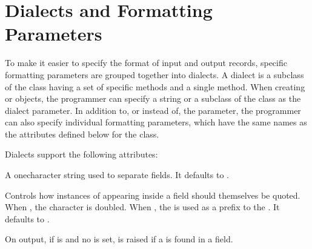\documentclass[letterpaper,10pt,english]{sphinxmanual}
\begin{document}
\section{Dialects and Formatting Parameters}
\label{\detokenize{csv:dialects-and-formatting-parameters}}\label{\detokenize{csv:csv-fmt-params}}
To make it easier to specify the format of input and output records, specific
formatting parameters are grouped together into dialects.  A dialect is a
subclass of the {\hyperref[\detokenize{csv:csv.Dialect}]{}} class having a set of specific methods and a
single  method.  When creating {\hyperref[\detokenize{csv:csv.reader}]{}} or
{\hyperref[\detokenize{csv:csv.writer}]{}} objects, the programmer can specify a string or a subclass of
the {\hyperref[\detokenize{csv:csv.Dialect}]{}} class as the dialect parameter.  In addition to, or instead
of, the  parameter, the programmer can also specify individual
formatting parameters, which have the same names as the attributes defined below
for the {\hyperref[\detokenize{csv:csv.Dialect}]{}} class.

Dialects support the following attributes:

\begin{fulllineitems}
\label{\detokenize{csv:csv.Dialect.delimiter}}
A one\sphinxhyphen{}character string used to separate fields.  It defaults to \sphinxcode{\sphinxupquote{\textquotesingle{},\textquotesingle{}}}.

\end{fulllineitems}


\begin{fulllineitems}
\label{\detokenize{csv:csv.Dialect.doublequote}}
Controls how instances of  appearing inside a field should
themselves be quoted.  When , the character is doubled. When
, the  is used as a prefix to the .  It
defaults to .

On output, if  is  and no  is set,
{\hyperref[\detokenize{csv:csv.Error}]{}} is raised if a  is found in a field.

\end{fulllineitems}
\end{document}
